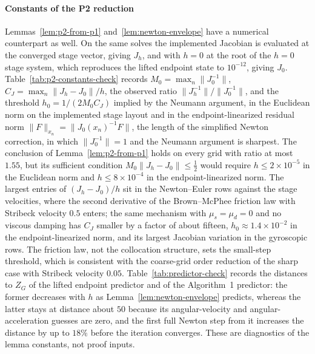 \documentclass[preprint,12pt]{elsarticle}
\begin{document}
\paragraph{Constants of the P2 reduction}
Lemmas~\ref{lem:p2-from-p1} and~\ref{lem:newton-envelope} have a numerical
counterpart as well. On the same solves the implemented Jacobian is evaluated
at the converged stage vector, giving $J_h$, and with $h=0$ at the root of
the $h=0$ stage system, which reproduces the lifted endpoint state to
$10^{-12}$, giving $J_0$. Table~\ref{tab:p2-constants-check} records
$M_0=\max_n\|J_0^{-1}\|$, $C_J=\max_n\|J_h-J_0\|/h$, the observed ratio
$\|J_h^{-1}\|/\|J_0^{-1}\|$, and the threshold $h_0=1/(2M_0C_J)$ implied by
the Neumann argument, in the Euclidean norm on the implemented stage layout
and in the endpoint-linearized residual norm $\|F\|_{x_n}=\|J_0(x_n)^{-1}F\|$,
the length of the simplified Newton correction, in which $\|J_0^{-1}\|=1$ and
the Neumann argument is sharpest. The conclusion of
Lemma~\ref{lem:p2-from-p1} holds on every grid with ratio at most $1.55$,
but its sufficient condition $M_0\|J_h-J_0\|\le\tfrac12$ would require
$h\le2\times10^{-5}$ in the Euclidean norm and $h\le8\times10^{-4}$ in the
endpoint-linearized norm. The largest entries of $(J_h-J_0)/h$ sit in the
Newton--Euler rows against the stage velocities, where the second derivative
of the Brown--McPhee friction law with Stribeck velocity $0.5$ enters; the
same mechanism with $\mu_s=\mu_d=0$ and no viscous damping has
$C_J$ smaller by a factor of about fifteen, $h_0\approx1.4\times10^{-2}$ in
the endpoint-linearized norm, and its largest Jacobian variation in the
gyroscopic rows. The friction law, not the collocation structure, sets the
small-step threshold, which is consistent with the coarse-grid order
reduction of the sharp case with Stribeck velocity $0.05$.
Table~\ref{tab:predictor-check} records the distances to $Z_G$ of the lifted
endpoint predictor and of the Algorithm~1 predictor: the former decreases
with $h$ as Lemma~\ref{lem:newton-envelope} predicts, whereas the latter
stays at distance about $50$ because its angular-velocity and
angular-acceleration guesses are zero, and the first full Newton step from it
increases the distance by up to $18\%$ before the iteration converges. These
are diagnostics of the lemma constants, not proof inputs.
\end{document}
